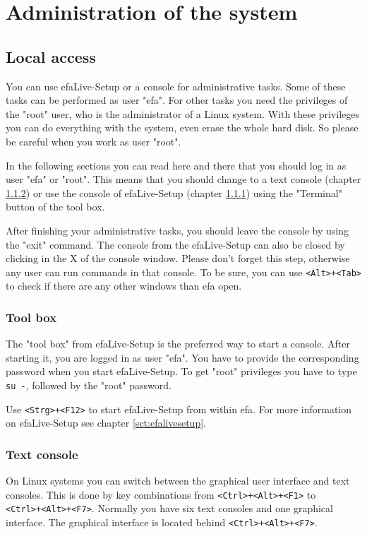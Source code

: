 \documentclass[a4paper,12pt,twoside]{article}
\begin{document}
\section{Administration of the system}
\label{sct:administration}
\subsection{Local access}
\label{sct:local_access}
You can use efaLive-Setup or a console for
administrative tasks. Some of these tasks can be performed as user
"efa". For other tasks you need the
privileges of the "root" user, who is the
administrator of a Linux system. With these privileges you can do
everything with the system, even erase the whole hard disk. So please
be careful when you work as user "root".

In the following sections you can read here and there that you should
log in as user "efa" or
"root". This means that you should change
to a text console (chapter \ref{sct:text_console}) or use
the console of efaLive-Setup (chapter \ref{sct:toolbox})
using the "Terminal" button of the tool
box.

After finishing your administrative tasks, you should leave the console
by using the "exit" command. The console
from the efaLive-Setup can also be closed by clicking in the X of the
console window. Please don't forget this step,
otherwise any user can run commands in that console. To be sure, you
can use \texttt{{\textless}Alt{\textgreater}+{\textless}Tab{\textgreater}} to
check if there are any other windows than efa open.


\subsubsection{Tool box}
\label{sct:toolbox}
The "tool box" from efaLive-Setup is the preferred way to start a
console. After starting it, you are logged in as user
"efa". You have to provide the
corresponding password when you start efaLive-Setup. To get
"root" privileges you have to type
\texttt{su -}, followed by the
"root" password.

Use \texttt{{\textless}Strg{\textgreater}+{\textless}F12{\textgreater}} to start
efaLive-Setup from within efa. For more information on efaLive-Setup
see chapter \ref{sct:efalivesetup}.

\subsubsection{Text console}
\label{sct:text_console}
On Linux systems you can switch
between the graphical user interface and text consoles. This is done by
key combinations from
\texttt{{\textless}Ctrl{\textgreater}+{\textless}Alt{\textgreater}+{\textless}F1{\textgreater}} to\\
\texttt{{\textless}Ctrl{\textgreater}+{\textless}Alt{\textgreater}+{\textless}F7{\textgreater}}.
Normally you have six text consoles and one graphical interface. The graphical interface is located behind \texttt{{\textless}Ctrl{\textgreater}+{\textless}Alt{\textgreater}+{\textless}F7{\textgreater}}.
\end{document}
